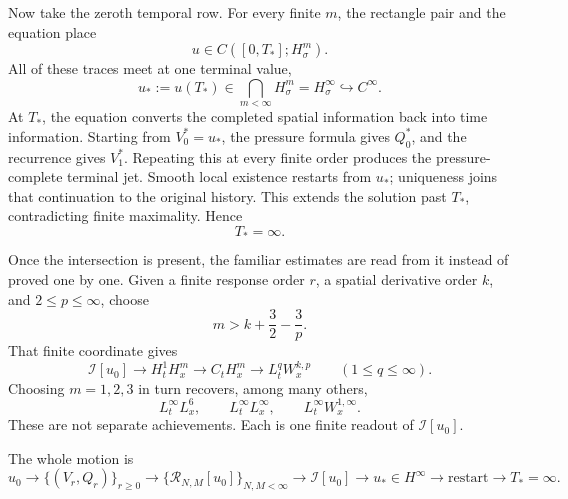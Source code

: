 Now take the zeroth temporal row.  For every finite \(m\), the rectangle pair
and the equation place
\[
u\in C([0,T_*];H^m_\sigma).
\]
All of these traces meet at one terminal value,
\[
u_*:=u(T_*)
\in\bigcap_{m<\infty}H^m_\sigma
=H^\infty_\sigma
\hookrightarrow C^\infty.
\]
At \(T_*\), the equation converts the completed spatial information back into
time information.  Starting from \(V_0^*=u_*\), the pressure formula gives
\(Q_0^*\), and the recurrence gives \(V_1^*\).  Repeating this at every finite
order produces the pressure-complete terminal jet.  Smooth local existence
restarts from \(u_*\); uniqueness joins that continuation to the original
history.  This extends the solution past \(T_*\), contradicting finite
maximality.  Hence
\[
T_*=\infty.
\]

Once the intersection is present, the familiar estimates are read from it
instead of proved one by one.  Given a finite response order \(r\), a spatial
derivative order \(k\), and \(2\le p\le\infty\), choose
\[
m>k+\frac32-\frac3p.
\]
That finite coordinate gives
\[
\mathcal I[u_0]
\longrightarrow H_t^1H_x^m
\longrightarrow C_tH_x^m
\longrightarrow L_t^qW_x^{k,p}
\qquad(1\le q\le\infty).
\]
Choosing \(m=1,2,3\) in turn recovers, among many others,
\[
L_t^\infty L_x^6,
\qquad
L_t^\infty L_x^\infty,
\qquad
L_t^\infty W_x^{1,\infty}.
\]
These are not separate achievements.  Each is one finite readout of
\(\mathcal I[u_0]\).

The whole motion is
\[
\boxed{
u_0
\longrightarrow \{(V_r,Q_r)\}_{r\ge0}
\longrightarrow \{\mathcal R_{N,M}[u_0]\}_{N,M<\infty}
\longrightarrow \mathcal I[u_0]
\longrightarrow u_*\in H^\infty
\longrightarrow \text{restart}
\longrightarrow T_*=\infty.
}
\]

\endgroup
